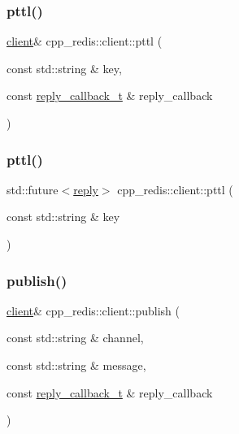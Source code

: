 \mbox{\label{classcpp__redis_1_1client_a2f10778d114d8144416b09645a7c6416}} 
\subsubsection{\texorpdfstring{pttl()}{pttl()}\hspace{0.1cm}{\footnotesize\ttfamily [1/2]}}
{\footnotesize\ttfamily \hyperlink{classcpp__redis_1_1client}{client}\& cpp\+\_\+redis\+::client\+::pttl (\begin{DoxyParamCaption}\item[{const std\+::string \&}]{key,  }\item[{const \hyperlink{classcpp__redis_1_1client_a061a1140d36d2eaeda82b09a0bb3f9f2}{reply\+\_\+callback\+\_\+t} \&}]{reply\+\_\+callback }\end{DoxyParamCaption})}

\mbox{\label{classcpp__redis_1_1client_adf173046c5866f6a9b9cd297a79b3028}} 
\subsubsection{\texorpdfstring{pttl()}{pttl()}\hspace{0.1cm}{\footnotesize\ttfamily [2/2]}}
{\footnotesize\ttfamily std\+::future$<$\hyperlink{classcpp__redis_1_1reply}{reply}$>$ cpp\+\_\+redis\+::client\+::pttl (\begin{DoxyParamCaption}\item[{const std\+::string \&}]{key }\end{DoxyParamCaption})}

\mbox{\label{classcpp__redis_1_1client_a1fba121a3d6e50811448e35917badfc6}} 
\subsubsection{\texorpdfstring{publish()}{publish()}\hspace{0.1cm}{\footnotesize\ttfamily [1/2]}}
{\footnotesize\ttfamily \hyperlink{classcpp__redis_1_1client}{client}\& cpp\+\_\+redis\+::client\+::publish (\begin{DoxyParamCaption}\item[{const std\+::string \&}]{channel,  }\item[{const std\+::string \&}]{message,  }\item[{const \hyperlink{classcpp__redis_1_1client_a061a1140d36d2eaeda82b09a0bb3f9f2}{reply\+\_\+callback\+\_\+t} \&}]{reply\+\_\+callback }\end{DoxyParamCaption})}

